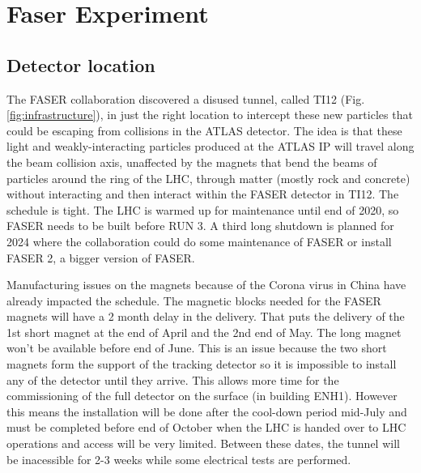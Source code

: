 \chapter{Faser Experiment}

\ifpdf
    \graphicspath{{ChapterFaser/Figs/Raster/}{Chapter3/Figs/PDF/}{Chapter3/Figs/}}
\else
    \graphicspath{{ChapterFaser/Figs/Vector/}{Chapter3/Figs/}}
\fi



\section{Detector location}


The FASER collaboration discovered a disused tunnel, called TI12 (Fig. \ref{fig:infrastructure}), in just the right location to intercept these new particles that could be escaping from collisions in the ATLAS detector. The idea is that these light and weakly-interacting particles produced at the ATLAS IP will travel along the beam collision axis, unaffected by the magnets that bend the beams of particles around the ring of the LHC, through matter (mostly rock and concrete) without interacting and then interact within the FASER detector in TI12. \cite{faser_collaboration_faser:_2019} The schedule is tight. The LHC is warmed up for maintenance until end of 2020, so FASER needs to be built before RUN 3. A third long shutdown is planned for 2024 where the collaboration could do some maintenance of FASER or install FASER 2, a bigger version of FASER.

Manufacturing issues on the magnets because of the Corona virus in China have already impacted the schedule. The magnetic blocks needed for the FASER magnets will have a 2 month delay in the delivery. That puts the delivery of the 1st short magnet at the end of April and the 2nd end of May. The long magnet won't be available before end of June. This is an issue because the two short magnets form the support of the tracking detector so it is impossible to install any of the detector until they arrive. This allows more time for the commissioning of the full detector on the surface (in building ENH1). However this means the installation will be done after the cool-down period mid-July and must be completed before end of October when the LHC is handed over to LHC operations and access will be very limited. Between these dates, the tunnel will be inacessible for 2-3 weeks while some electrical tests are performed.

